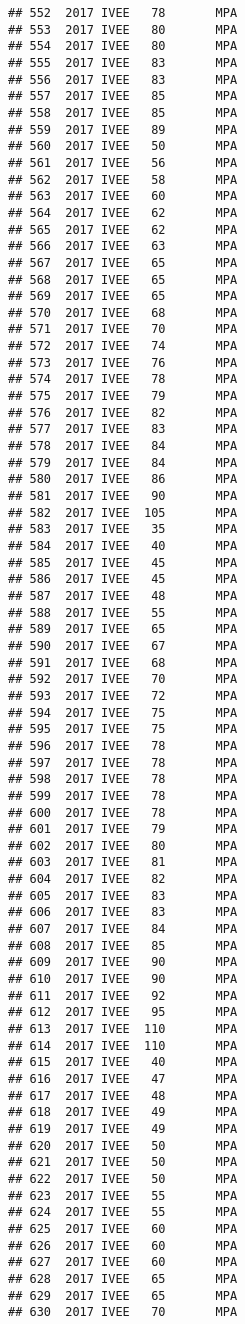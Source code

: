 \documentclass[]{article}
\begin{document}
\begin{verbatim}
## 552  2017 IVEE   78       MPA
## 553  2017 IVEE   80       MPA
## 554  2017 IVEE   80       MPA
## 555  2017 IVEE   83       MPA
## 556  2017 IVEE   83       MPA
## 557  2017 IVEE   85       MPA
## 558  2017 IVEE   85       MPA
## 559  2017 IVEE   89       MPA
## 560  2017 IVEE   50       MPA
## 561  2017 IVEE   56       MPA
## 562  2017 IVEE   58       MPA
## 563  2017 IVEE   60       MPA
## 564  2017 IVEE   62       MPA
## 565  2017 IVEE   62       MPA
## 566  2017 IVEE   63       MPA
## 567  2017 IVEE   65       MPA
## 568  2017 IVEE   65       MPA
## 569  2017 IVEE   65       MPA
## 570  2017 IVEE   68       MPA
## 571  2017 IVEE   70       MPA
## 572  2017 IVEE   74       MPA
## 573  2017 IVEE   76       MPA
## 574  2017 IVEE   78       MPA
## 575  2017 IVEE   79       MPA
## 576  2017 IVEE   82       MPA
## 577  2017 IVEE   83       MPA
## 578  2017 IVEE   84       MPA
## 579  2017 IVEE   84       MPA
## 580  2017 IVEE   86       MPA
## 581  2017 IVEE   90       MPA
## 582  2017 IVEE  105       MPA
## 583  2017 IVEE   35       MPA
## 584  2017 IVEE   40       MPA
## 585  2017 IVEE   45       MPA
## 586  2017 IVEE   45       MPA
## 587  2017 IVEE   48       MPA
## 588  2017 IVEE   55       MPA
## 589  2017 IVEE   65       MPA
## 590  2017 IVEE   67       MPA
## 591  2017 IVEE   68       MPA
## 592  2017 IVEE   70       MPA
## 593  2017 IVEE   72       MPA
## 594  2017 IVEE   75       MPA
## 595  2017 IVEE   75       MPA
## 596  2017 IVEE   78       MPA
## 597  2017 IVEE   78       MPA
## 598  2017 IVEE   78       MPA
## 599  2017 IVEE   78       MPA
## 600  2017 IVEE   78       MPA
## 601  2017 IVEE   79       MPA
## 602  2017 IVEE   80       MPA
## 603  2017 IVEE   81       MPA
## 604  2017 IVEE   82       MPA
## 605  2017 IVEE   83       MPA
## 606  2017 IVEE   83       MPA
## 607  2017 IVEE   84       MPA
## 608  2017 IVEE   85       MPA
## 609  2017 IVEE   90       MPA
## 610  2017 IVEE   90       MPA
## 611  2017 IVEE   92       MPA
## 612  2017 IVEE   95       MPA
## 613  2017 IVEE  110       MPA
## 614  2017 IVEE  110       MPA
## 615  2017 IVEE   40       MPA
## 616  2017 IVEE   47       MPA
## 617  2017 IVEE   48       MPA
## 618  2017 IVEE   49       MPA
## 619  2017 IVEE   49       MPA
## 620  2017 IVEE   50       MPA
## 621  2017 IVEE   50       MPA
## 622  2017 IVEE   50       MPA
## 623  2017 IVEE   55       MPA
## 624  2017 IVEE   55       MPA
## 625  2017 IVEE   60       MPA
## 626  2017 IVEE   60       MPA
## 627  2017 IVEE   60       MPA
## 628  2017 IVEE   65       MPA
## 629  2017 IVEE   65       MPA
## 630  2017 IVEE   70       MPA

\end{verbatim}
\end{document}
